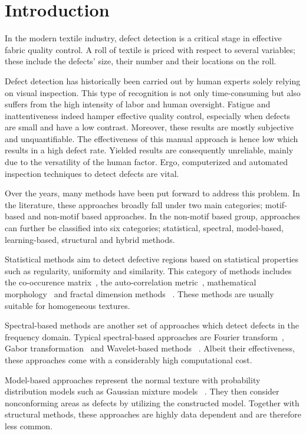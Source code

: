 \documentclass[3p,,preprint,review,12pt]{elsarticle}
\begin{document}
\section{Introduction}
In the modern textile industry, defect detection is a critical stage in effective fabric quality control. A roll of textile is priced with respect to several variables; these include the defects' size, their number and their locations on the roll. 

Defect detection has historically been carried out by human experts solely relying on visual inspection. This type of recognition is not only time-consuming but also suffers from the high intensity of labor and human oversight. Fatigue and inattentiveness indeed hamper effective quality control, especially when defects are small and have a low contrast. Moreover, these results are mostly subjective and unquantifiable. The effectiveness of this manual approach is hence low which results in a high defect rate. Yielded results are consequently unreliable, mainly due to the versatility of the human factor. Ergo, computerized and automated inspection techniques to detect defects are vital. 

Over the years, many methods have been put forward to address this problem. In the literature, these approaches broadly fall under two main categories; motif-based and non-motif based approaches. In the non-motif based group, approaches can further be classified into six categories; statistical, spectral, model-based, learning-based, structural and hybrid methods. 

Statistical methods aim to detect defective regions based on statistical properties such as regularity, uniformity and similarity. This category of methods includes the co-occurence
matrix\unskip~\cite{981091:21201186, 981091:21201184}, the auto-correlation metric\unskip~\cite{981091:21238444}, mathematical morphology\unskip~\cite{981091:21201195} and fractal dimension methods \unskip~\cite{981091:21201182}. These methods are usually suitable for homogeneous textures.

Spectral-based methods are another set of approaches which detect defects in the frequency domain. Typical spectral-based approaches are Fourier transform\unskip~\cite{981091:21201190}, Gabor transformation\unskip~\cite{981091:21201199} and Wavelet-based methods \unskip~\cite{981091:21201168}. Albeit their effectiveness, these approaches come with a considerably high computational cost.

Model-based approaches represent the normal texture with probability distribution models such as Gaussian mixture models \unskip~\cite{981091:21201219}. They then consider nonconforming areas as defects by utilizing the constructed model. Together with structural methods, these approaches are highly data dependent and are therefore less common.
\end{document}
